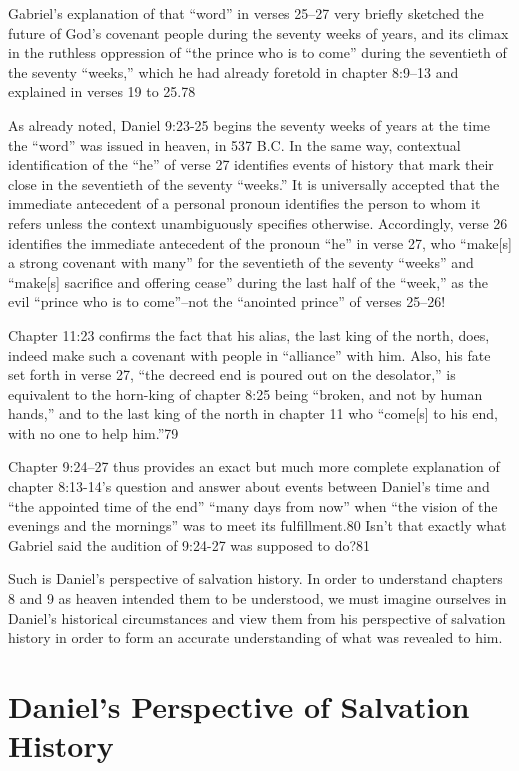 Gabriel's explanation of that ``word'' in verses 25--27 very briefly sketched
the future of God's covenant people during the seventy weeks of years, and
its climax in the ruthless oppression of ``the prince who is to come'' during
the seventieth of the seventy ``weeks,'' which he had already foretold in
chapter 8:9--13 and explained in verses 19 to 25.78 

As already noted, Daniel 9:23-25 begins the seventy weeks of years at the
time the ``word'' was issued in heaven, in 537 B.C. In the same way,
contextual identification of the ``he'' of verse 27 identifies events of
history that mark their close in the seventieth of the seventy ``weeks.'' It
is universally accepted that the immediate antecedent of a personal pronoun
identifies the person to whom it refers unless the context unambiguously
specifies otherwise. Accordingly, verse 26 identifies the immediate
antecedent of the pronoun ``he'' in verse 27, who ``make[s] a strong covenant
with many'' for the seventieth of the seventy ``weeks'' and ``make[s] sacrifice
and offering cease'' during the last half of the ``week,'' as the evil ``prince
who is to come''--not the ``anointed prince'' of verses 25--26! 

Chapter 11:23 confirms the fact that his alias, the last king of the north,
does, indeed make such a covenant with people in ``alliance'' with him. Also,
his fate set forth in verse 27, ``the decreed end is poured out on the
desolator,'' is equivalent to the horn-king of chapter 8:25 being ``broken,
and not by human hands,'' and to the last king of the north in chapter 11 who
``come[s] to his end, with no one to help him.''79 

Chapter 9:24--27 thus provides an exact but much more complete explanation of
chapter 8:13-14's question and answer about events between Daniel's time and
``the appointed time of the end'' ``many days from now'' when ``the vision of the
evenings and the mornings'' was to meet its fulfillment.80 Isn't that exactly
what Gabriel said the audition of 9:24-27 was supposed to do?81 

Such is Daniel's perspective of salvation history. In order to understand
chapters 8 and 9 as heaven intended them to be understood, we must imagine
ourselves in Daniel's historical circumstances and view them from his
perspective of salvation history in order to form an accurate understanding
of what was revealed to him.

\section{Daniel's Perspective of Salvation History}

